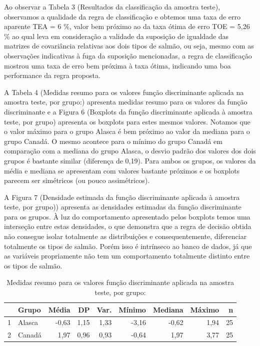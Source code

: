\documentclass[10pt,portuguese,]{article}
\begin{document}
\vspace{0.5cm}

Ao observar a Tabela 3 (Resultados da classificação da amostra teste),
observamos a qualidade da regra de classificação e obtemos uma taxa de
erro aparente TEA = 6 \(\%\), valor bem próximo ao da taxa ótima de erro
TOE = 5,26 \(\%\) ao qual leva em consideração a validade da suposição
de igualdade das matrizes de covariância relativas aos dois tipos de
salmão, ou seja, mesmo com as observações indicativas à fuga da
suposição mencionadas, a regra de classificação mostrou uma taxa de erro
bem próxima à taxa ótima, indicando uma boa performance da regra
proposta.

A Tabela 4 (Medidas resumo para os valores função discriminante aplicada
na amostra teste, por grupo:) apresenta medidas resumo para os valores
da função discriminante e a Figura 6 (Boxplots da função discriminante
aplicada à amostra teste, por grupo) apresenta os boxplots para estes
mesmos valores. Notamos que o valor máximo para o grupo Alasca é bem
próximo ao valor da mediana para o grupo Canadá. O mesmo acontece para o
mínimo do grupo Canadá em comparação com a mediana do grupo Alasca, o
desvio padrão dos valores dos dois grupos é bastante similar (diferença
de 0,19). Para ambos os grupos, os valores da média e mediana se
apresentam com valores bastante próximos e os boxplots parecem ser
simétricos (ou pouco assimétricos).

A Figura 7 (Densidade estimada da função discriminante aplicada à
amostra teste, por grupo)) apresenta as densidades estimadas da função
discriminante para os grupos. À luz do comportamento apresentado pelos
boxplots temos uma interseção entre estas densidades, o que demonstra
que a regra de decisão obtida não consegue isolar totalmente as
distribuições e consequentemente, diferenciar totalmente os tipos de
salmão. Porém isso é intrínseco ao banco de dados, já que as variáveis
propriamente não tem um comportamento totalmente distinto entre os tipos
de salmão.

\vspace{0.5cm}

\begin{table}[ht]
\centering
\caption{Medidas resumo para os valores função discriminante aplicada na amostra teste, por grupo:}
\bgroup
\def\arraystretch{1.5}
\begin{tabular}{rlrrrrrrr}
\toprule
& Grupo & Média & DP & Var. & Mínimo & Mediana & Máximo & n \\ \midrule
\hline
1 & Alasca & -0,63 & 1,15 & 1,33 & -3,16 & -0,62 & 1,94 & 25 \\
2 & Canadá & 1,97 & 0,96 & 0,93 & -0,64 & 1,97 & 3,77 & 25 \\ \bottomrule
\hline
\end{tabular}
\egroup
\end{table}
\end{document}
